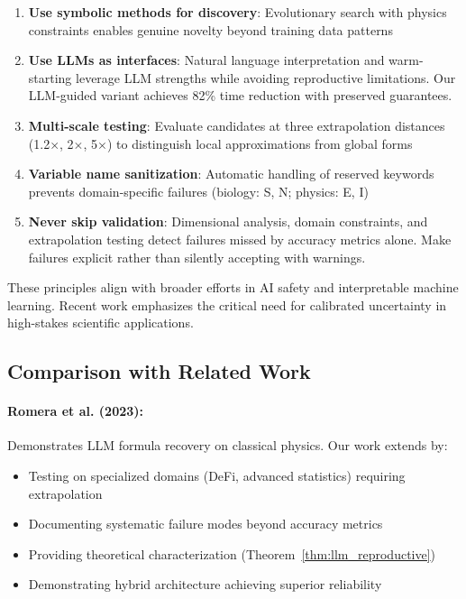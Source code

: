 \documentclass[twoside,11pt]{article}
\begin{document}
\begin{enumerate}
\item \textbf{Use symbolic methods for discovery}: Evolutionary search with physics constraints enables genuine novelty beyond training data patterns\citep{koza1994genetic}

\item \textbf{Use LLMs as interfaces}: Natural language interpretation and warm-starting leverage LLM strengths while avoiding reproductive limitations. Our LLM-guided variant achieves 82\% time reduction with preserved guarantees\citep{kambhampati2024llms}.

\item \textbf{Multi-scale testing}: Evaluate candidates at three extrapolation distances (1.2$\times$, 2$\times$, 5$\times$) to distinguish local approximations from global forms

\item \textbf{Variable name sanitization}: Automatic handling of reserved keywords prevents domain-specific failures (biology: S, N; physics: E, I)

\item \textbf{Never skip validation}: Dimensional analysis, domain constraints, and extrapolation testing detect failures missed by accuracy metrics alone. Make failures explicit rather than silently accepting with warnings.
\end{enumerate}

These principles align with broader efforts in AI safety and interpretable machine learning. Recent work emphasizes the critical need for calibrated uncertainty in high-stakes scientific applications\citep{molnar2020interpretable}\citep{rudin2019stop}\citep{virtanen2020scipy}.


\subsection{Comparison with Related Work}

\paragraph{Romera et al. (2023):} Demonstrates LLM formula recovery on classical physics\citep{kambhampati2024llms}. Our work extends by:
\begin{itemize}
\item Testing on specialized domains (DeFi, advanced statistics) requiring extrapolation
\item Documenting systematic failure modes beyond accuracy metrics
\item Providing theoretical characterization (Theorem~\ref{thm:llm_reproductive})\citep{kambhampati2024llms}
\item Demonstrating hybrid architecture achieving superior reliability
\end{itemize}
\end{document}
